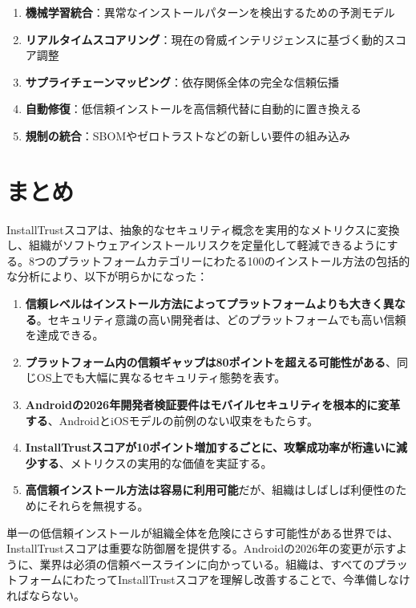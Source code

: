 \documentclass[Specialissue]{jsaiart}
\begin{document}
\begin{enumerate}
    \item \textbf{機械学習統合}：異常なインストールパターンを検出するための予測モデル
    \item \textbf{リアルタイムスコアリング}：現在の脅威インテリジェンスに基づく動的スコア調整
    \item \textbf{サプライチェーンマッピング}：依存関係全体の完全な信頼伝播
    \item \textbf{自動修復}：低信頼インストールを高信頼代替に自動的に置き換える
    \item \textbf{規制の統合}：SBOMやゼロトラストなどの新しい要件の組み込み
\end{enumerate}

\section{まとめ}

InstallTrustスコアは、抽象的なセキュリティ概念を実用的なメトリクスに変換し、組織がソフトウェアインストールリスクを定量化して軽減できるようにする。8つのプラットフォームカテゴリーにわたる100のインストール方法の包括的な分析により、以下が明らかになった：

\begin{enumerate}
    \item \textbf{信頼レベルはインストール方法によってプラットフォームよりも大きく異なる}。セキュリティ意識の高い開発者は、どのプラットフォームでも高い信頼を達成できる。
    
    \item \textbf{プラットフォーム内の信頼ギャップは80ポイントを超える可能性がある}、同じOS上でも大幅に異なるセキュリティ態勢を表す。
    
    \item \textbf{Androidの2026年開発者検証要件はモバイルセキュリティを根本的に変革する}、AndroidとiOSモデルの前例のない収束をもたらす。
    
    \item \textbf{InstallTrustスコアが10ポイント増加するごとに、攻撃成功率が桁違いに減少する}、メトリクスの実用的な価値を実証する。
    
    \item \textbf{高信頼インストール方法は容易に利用可能}だが、組織はしばしば利便性のためにそれらを無視する。
\end{enumerate}

単一の低信頼インストールが組織全体を危険にさらす可能性がある世界では、InstallTrustスコアは重要な防御層を提供する。Androidの2026年の変更が示すように、業界は必須の信頼ベースラインに向かっている。組織は、すべてのプラットフォームにわたってInstallTrustスコアを理解し改善することで、今準備しなければならない。
\end{document}
